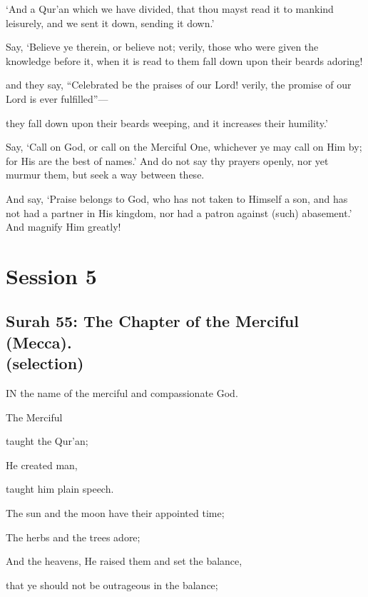 \documentclass[fontsize=14pt, letterpaper, notitlepage, openany, DIV=12]{scrbook} %
\begin{document}
\noindent[17:106]
`And a Qur'an which we have divided, that thou mayst read it to mankind leisurely, and
we sent it down, sending it down.'

\noindent[17:107]
Say, `Believe ye therein, or believe not; verily, those who were given the knowledge
before it, when it is read to them fall down upon their beards adoring!

\noindent[17:108]
and they say, ``Celebrated be the praises of our Lord! verily, the promise of our Lord is
ever fulfilled''---

\noindent[17:109]
they fall down upon their beards weeping, and it increases their humility.'

\noindent[17:110]
Say, `Call on God, or call on the Merciful One, whichever ye may call on Him by; for
His are the best of names.' And do not say thy prayers openly, nor yet murmur them, but seek a
way between these.

\noindent[17:111]
And say, `Praise belongs to God, who has not taken to Himself a son, and has not had a
partner in His kingdom, nor had a patron against (such) abasement.' And magnify Him greatly!

\clearpage
\chapter{Session 5}


\section[Surah 55: The Chapter of the Merciful (Mecca).]{Surah 55: The Chapter of the Merciful (Mecca).\\ (selection)}


IN the name of the merciful and compassionate God.

\noindent[55:1]
The Merciful

\noindent[55:2]
taught the Qur'an;

\noindent[55:3]
He created man,

\noindent[55:4]
taught him plain speech.

\noindent[55:5]
The sun and the moon have their appointed time;

\noindent[55:6]
The herbs and the trees adore;

\noindent[55:7]
And the heavens, He raised them and set the balance,

\noindent[55:8]
that ye should not be outrageous in the balance;
\end{document}
